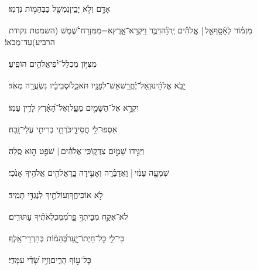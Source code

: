 \documentclass[12pt]{article}
\newcommand{\loc}[1]{\textsuperscript{\locf{#1}}}
\begin{document}
{\loc{ כא}~}‏אָדָ֣ם  וְלֹ֣א יָבִ֑ין{\hfill}נִמְשַׁ֖ל כַּבְּהֵמ֣וֹת נִדְמֽוּ׃\par\pend
\ledpb
\pstart[\subsection*{\textcolor{red}{פרק נ}}]\label{פרק נ}
{\loc{ א}~}‏מִזְמ֗וֹר לְאָ֫סָ֥ף\newline\hspace*{.5em}אֵ֤ל |  אֱֽלֹהִ֡ים יְֽהֹוָ֗ה{\hfill}דִּבֶּ֥ר וַיִּקְרָא־אָ֑רֶץ\newline\hspace*{.5em}א=מִמִּזְרַח־שֶׁ֝מֶשׁ (השמטת נקודת הרביע){\hfill}עַד־מְבֹאֽוֹ׃\par

{\loc{ ב}~}‏מִצִּיּ֥וֹן מִכְלַל־יֹ֗פִי{\hfill}אֱלֹהִ֥ים הוֹפִֽיעַ׃\par

{\loc{ ג}~}‏יָ֤בֹ֥א אֱלֹהֵ֗ינוּ{\hfill}וְֽאַל־יֶ֫חֱרַ֥שׁ\newline\hspace*{.5em}אֵשׁ־לְפָנָ֥יו תֹּאכֵ֑ל{\hfill}וּ֝סְבִיבָ֗יו נִשְׂעֲרָ֥ה מְאֹֽד׃\par

{\loc{ ד}~}‏יִקְרָ֣א אֶל־הַשָּׁמַ֣יִם מֵעָ֑ל{\hfill}וְאֶל־הָ֝אָ֗רֶץ לָדִ֥ין עַמּֽוֹ׃\par

{\loc{ ה}~}‏אִסְפוּ־לִ֥י חֲסִידָ֑י{\hfill}כֹּרְתֵ֖י בְרִיתִ֣י עֲלֵי־זָֽבַח׃\par

{\loc{ ו}~}‏וַיַּגִּ֣ידוּ שָׁמַ֣יִם צִדְק֑וֹ{\hfill}כִּֽי־אֱלֹהִ֓ים |  שֹׁפֵ֖ט ה֣וּא סֶֽלָה׃\par

{\loc{ ז}~}‏שִׁמְעָ֤ה עַמִּ֨י | {\hfill}וַאֲדַבֵּ֗רָה\newline\hspace*{.5em} וְאָעִ֣ידָה בָּ֑ךְ{\hfill}אֱלֹהִ֖ים אֱלֹהֶ֣יךָ אָנֹֽכִי׃\par

{\loc{ ח}~}‏לֹ֣א  אוֹכִיחֶ֑ךָ{\hfill}וְעוֹלֹתֶ֖יךָ לְנֶגְדִּ֣י תָמִֽיד׃\par

{\loc{ ט}~}‏לֹא־אֶקַּ֣ח מִבֵּיתְךָ֣ פָ֑ר{\hfill}מִ֝מִּכְלְאֹתֶ֗יךָ עַתּוּדִֽים׃\par

{\loc{ י}~}‏כִּי־לִ֥י כׇל־חַיְתוֹ־יָ֑עַר{\hfill}בְּ֝הֵמ֗וֹת בְּהַרְרֵי־אָֽלֶף׃\par

{\loc{ יא}~}‏ כׇּל־ע֣וֹף הָרִ֑ים{\hfill}וְזִ֥יז שָׂ֝דַ֗י עִמָּדִֽי׃\par
\end{document}

